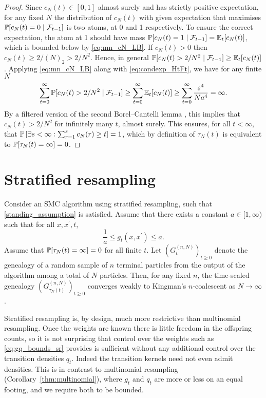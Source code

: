 \begin{proof}
Since $c_N(t) \in [0,1]$ almost surely and has strictly positive expectation, for any fixed $N$ the distribution of $c_N(t)$ with given expectation that maximises $\mathbb{P}[ c_N(t)=0 \mid \mathcal{F}_{t-1} ]$ is two atoms, at 0 and 1 respectively. To ensure the correct expectation, the atom at 1 should have mass $\mathbb{P}[ c_N(t)=1 \mid \mathcal{F}_{t-1} ] = \mathbb{E}_t [ c_N(t) ]$, which is bounded below by \eqref{eq:mn_cN_LB}.
If $c_N(t) > 0$ then $c_N(t) \geq 2/(N)_2 > 2/N^2$. Hence, in general $\mathbb{P}[ c_N(t) > 2/N^2 \mid \mathcal{F}_{t-1} ] \geq \mathbb{E}_t [c_N(t)]$. 
Applying \eqref{eq:mn_cN_LB} along with \eqref{eq:condexp_HtFt}, we have for any finite $N$
\begin{equation*}
\sum_{t=0}^\infty \mathbb{P}[ c_N(t) > 2/N^2 \mid \mathcal{F}_{t-1} ]
\geq \sum_{t=0}^\infty \mathbb{E}_t [ c_N(t) ]
\geq \sum_{t=0}^\infty \frac{\varepsilon^4}{Na^4}
= \infty .
\end{equation*}
By a filtered version of the second Borel--Cantelli lemma \parencite[see for example][Theorem 4.3.4]{durrett2019}, this implies that $c_N(t) >2/N^2$ for infinitely many $t$, almost surely.
This ensures, for all $t <\infty$, that $\mathbb{P}\left[ \exists s<\infty : \sum_{r=1}^s c_N(r) \geq t \right] =1$, which by definition of $\tau_N(t)$ is equivalent to $\mathbb{P}[ \tau_N(t) = \infty ] =0$.
\end{proof}




\section{Stratified resampling}

\begin{corollary}\label{thm:stratified}
Consider an SMC algorithm using stratified resampling, such that \ref{standing_assumption} is satisfied.
Assume that there exists a constant $a\in [1,\infty)$ such that for all $x, x^\prime, t$,
\begin{equation}\label{eq:gq_bounds_sr}
\frac{1}{a} \leq g_t(x, x^\prime) \leq a .
\end{equation}
Assume that $\mathbb{P}[ \tau_N(t) = \infty] =0$ for all finite $t$.
Let $(G_t^{(n,N)})_{t\geq0}$ denote the genealogy of a random sample of $n$ terminal particles from the output of the algorithm among a total of $N$ particles. Then, for any fixed $n$, the time-scaled genealogy $(G_{\tau_N(t)}^{(n,N)})_{t\geq0}$ converges weakly to Kingman's $n$-coalescent as $N\to \infty$.%
\end{corollary}
Stratified resampling is, by design, much more restrictive than multinomial resampling. Once the weights are known there is little freedom in the offspring counts, so it is not surprising that control over the weights such as \eqref{eq:gq_bounds_sr} provides is sufficient without any additional control over the transition densities $q_t$. 
Indeed the transition kernels need not even admit densities.
This is in contrast to multinomial resampling (Corollary~\ref{thm:multinomial}), where $g_t$ and $q_t$ are more or less on an equal footing, and we require both to be bounded.

